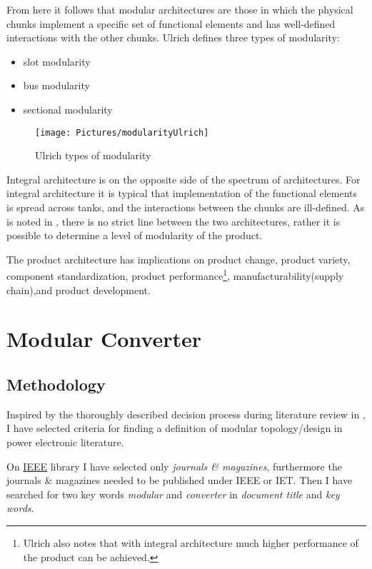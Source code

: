 \documentclass[]{scrartcl}
\begin{document}
		
From here it follows that modular architectures are those in which the physical chunks implement a specific set of functional elements and has well-defined interactions with the other chunks. Ulrich defines three types of modularity:
\begin{itemize}
\item slot modularity
\item bus modularity
\item sectional modularity
\end{itemize}
\begin{figure}[h!]
\centering
\texttt{[image: Pictures/modularityUlrich]}
\caption{Ulrich types of modularity}
\label{fig:modularityulrich}
\end{figure}

				
Integral architecture is on the opposite side of the spectrum of architectures. For integral architecture it is typical that implementation of the functional elements is spread across tanks, and the interactions between the chunks are ill-defined. As is noted in \cite{Ulrich2004}, there is no strict line between the two architectures, rather it is possible to determine a level of modularity of  the product. 
				
The product architecture has implications on product change, product variety, component standardization, product performance\footnote{Ulrich also notes that with integral architecture much higher performance of the product can be achieved.}, manufacturability(supply chain),and product development.  




\section{Modular Converter}

\subsection{Methodology}
Inspired by the thoroughly described decision process during literature review in \cite{Salvador2007}, I have selected criteria for finding a definition of modular topology/design in power electronic literature. 

On \href{<http://ieeexplore.ieee.org/Xplore/home.jsp>}{IEEE} library I have selected only \emph{journals \& magazines}, furthermore the journals \& magazines needed to be published under IEEE or IET.  Then I have searched for two key words \emph{modular} and \emph{converter} in \emph{document title} and \emph{key words}. 
\end{document}
